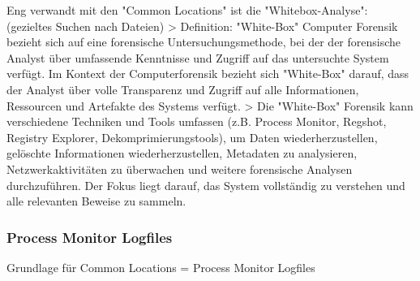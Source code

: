 Eng verwandt mit den "Common Locations" ist die "Whitebox-Analyse": (gezieltes Suchen nach Dateien) \cite{Bonetti.2014}
> Definition: "White-Box" Computer Forensik bezieht sich auf eine forensische Untersuchungsmethode, bei der der forensische Analyst über umfassende Kenntnisse und Zugriff auf das untersuchte System verfügt. Im Kontext der Computerforensik bezieht sich "White-Box" darauf, dass der Analyst über volle Transparenz und Zugriff auf alle Informationen, Ressourcen und Artefakte des Systems verfügt.
> Die "White-Box" Forensik kann verschiedene Techniken und Tools umfassen (z.B. Process Monitor, Regshot, Registry Explorer, Dekomprimierungstools), um Daten wiederherzustellen, gelöschte Informationen wiederherzustellen, Metadaten zu analysieren, Netzwerkaktivitäten zu überwachen und weitere forensische Analysen durchzuführen. Der Fokus liegt darauf, das System vollständig zu verstehen und alle relevanten Beweise zu sammeln.

\subsubsection*{Process Monitor Logfiles}

Grundlage für Common Locations = Process Monitor Logfiles

